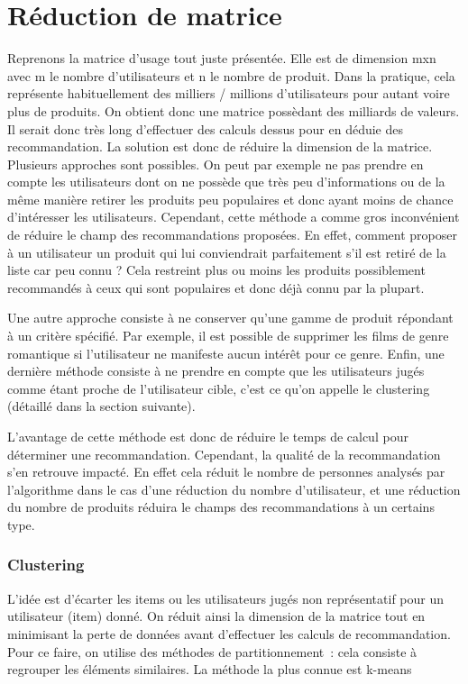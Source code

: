 \documentclass{report}
\begin{document}
\section{Réduction de matrice}
Reprenons la matrice d'usage tout juste présentée. Elle est de dimension mxn avec m le nombre d'utilisateurs et n le nombre de produit. Dans la pratique, cela représente habituellement des milliers / millions d'utilisateurs pour autant voire plus de produits. On obtient donc une matrice possèdant des milliards de valeurs. Il serait donc très long d'effectuer des calculs dessus pour en déduie des recommandation. La solution est donc de réduire la dimension de la matrice.
Plusieurs approches sont possibles. On peut par exemple ne pas prendre en compte les utilisateurs dont on ne possède que très peu d'informations ou de la même manière retirer les produits peu populaires et donc ayant moins de chance d'intéresser les utilisateurs. Cependant, cette méthode a comme gros inconvénient de réduire le champ des recommandations proposées. En effet, comment proposer à un utilisateur un produit qui lui conviendrait parfaitement s'il est retiré de la liste car peu connu ? Cela restreint plus ou moins les produits possiblement recommandés à ceux qui sont populaires et donc déjà connu par la plupart.\par
Une autre approche consiste à ne conserver qu'une gamme de produit répondant à un critère spécifié. Par exemple, il est possible de supprimer les films de genre romantique si l'utilisateur ne manifeste aucun intérêt pour ce genre. Enfin, une dernière méthode consiste à ne prendre en compte que les utilisateurs jugés comme étant proche de l'utilisateur cible, c'est ce qu'on appelle le clustering (détaillé dans la section suivante).\par
L'avantage de cette méthode est donc de réduire le temps de calcul pour déterminer une recommandation. Cependant, la qualité de la recommandation s'en retrouve impacté. En effet cela réduit le nombre de personnes analysés par l’algorithme dans le cas d’une réduction du nombre d’utilisateur, et une réduction du nombre de produits réduira le champs des recommandations à un certains type.
\subsubsection{Clustering}
L’idée est d’écarter les items ou les utilisateurs jugés non représentatif pour un utilisateur (item) donné. On réduit ainsi la dimension de la matrice tout en minimisant la perte de données avant d’effectuer les calculs de recommandation.
Pour ce faire, on utilise des méthodes de partitionnement : cela consiste à regrouper les éléments similaires. La méthode la plus connue est k-means
\end{document}
